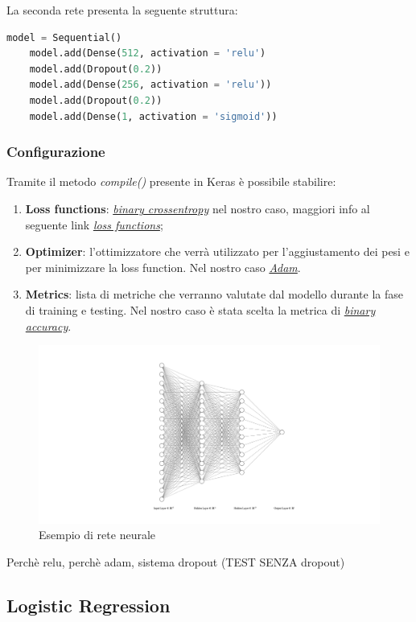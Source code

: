 La seconda rete presenta la seguente struttura:
\begin{lstlisting}[language=Python]
	model = Sequential()
	model.add(Dense(512, activation = 'relu')
	model.add(Dropout(0.2))
	model.add(Dense(256, activation = 'relu'))
	model.add(Dropout(0.2))
	model.add(Dense(1, activation = 'sigmoid'))
\end{lstlisting}
	 
\subsubsection{Configurazione}
Tramite il metodo \textit{compile()} presente in Keras è possibile stabilire:
\begin{enumerate}
\item \textbf{Loss functions}: \href{https://en.wikipedia.org/wiki/Cross_entropy}{\textit{binary crossentropy}} nel nostro caso, maggiori info al seguente link \href{https://keras.io/losses/}{\textit{loss functions}};
\item \textbf{Optimizer}: l'ottimizzatore che verrà utilizzato per l'aggiustamento dei pesi e per minimizzare la loss function.
Nel nostro caso \href{https://arxiv.org/pdf/1412.6980v8.pdf}{\textit{Adam}}. 
\item \textbf{Metrics}: lista di metriche che verranno valutate dal modello durante la fase di training e testing.
Nel nostro caso è stata scelta la metrica di \href{https://keras.io/metrics/#binary_accuracy}{\textit{binary accuracy}}.  
\end{enumerate} 

\begin{figure}[H]
\includegraphics[scale=0.5,center]{img/nnExample.png}
\caption{Esempio di rete neurale}
\end{figure}

Perchè relu, perchè adam, sistema dropout
(TEST SENZA dropout)
\subsection{Logistic Regression}